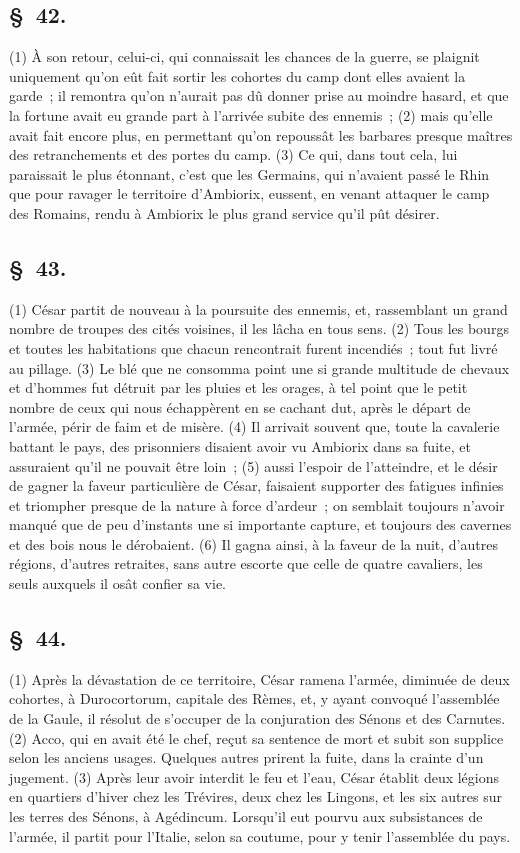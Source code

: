 \documentclass[french,twoside]{book} %
\begin{document}
\subsection[{§ 42.}]{ \textsc{§ 42.} }
\noindent (1) À son retour, celui-ci, qui connaissait les chances de la guerre, se plaignit uniquement qu’on eût fait sortir les cohortes du camp dont elles avaient la garde ; il remontra qu’on n’aurait pas dû donner prise au moindre hasard, et que la fortune avait eu grande part à l’arrivée subite des ennemis ; (2) mais qu’elle avait fait encore plus, en permettant qu’on repoussât les barbares presque maîtres des retranchements et des portes du camp. (3) Ce qui, dans tout cela, lui paraissait le plus étonnant, c’est que les Germains, qui n’avaient passé le Rhin que pour ravager le territoire d’Ambiorix, eussent, en venant attaquer le camp des Romains, rendu à Ambiorix le plus grand service qu’il pût désirer.
\subsection[{§ 43.}]{ \textsc{§ 43.} }
\noindent (1) César partit de nouveau à la poursuite des ennemis, et, rassemblant un grand nombre de troupes des cités voisines, il les lâcha en tous sens. (2) Tous les bourgs et toutes les habitations que chacun rencontrait furent incendiés ; tout fut livré au pillage. (3) Le blé que ne consomma point une si grande multitude de chevaux et d’hommes fut détruit par les pluies et les orages, à tel point que le petit nombre de ceux qui nous échappèrent en se cachant dut, après le départ de l’armée, périr de faim et de misère. (4) Il arrivait souvent que, toute la cavalerie battant le pays, des prisonniers disaient avoir vu Ambiorix dans sa fuite, et assuraient qu’il ne pouvait être loin ; (5) aussi l’espoir de l’atteindre, et le désir de gagner la faveur particulière de César, faisaient supporter des fatigues infinies et triompher presque de la nature à force d’ardeur ; on semblait toujours n’avoir manqué que de peu d’instants une si importante capture, et toujours des cavernes et des bois nous le dérobaient. (6) Il gagna ainsi, à la faveur de la nuit, d’autres régions, d’autres retraites, sans autre escorte que celle de quatre cavaliers, les seuls auxquels il osât confier sa vie.
\subsection[{§ 44.}]{ \textsc{§ 44.} }
\noindent (1) Après la dévastation de ce territoire, César ramena l’armée, diminuée de deux cohortes, à Durocortorum, capitale des Rèmes, et, y ayant convoqué l’assemblée de la Gaule, il résolut de s’occuper de la conjuration des Sénons et des Carnutes. (2) Acco, qui en avait été le chef, reçut sa sentence de mort et subit son supplice selon les anciens usages. Quelques autres prirent la fuite, dans la crainte d’un jugement. (3) Après leur avoir interdit le feu et l’eau, César établit deux légions en quartiers d’hiver chez les Trévires, deux chez les Lingons, et les six autres sur les terres des Sénons, à Agédincum. Lorsqu’il eut pourvu aux subsistances de l’armée, il partit pour l’Italie, selon sa coutume, pour y tenir l’assemblée du pays.
\end{document}
